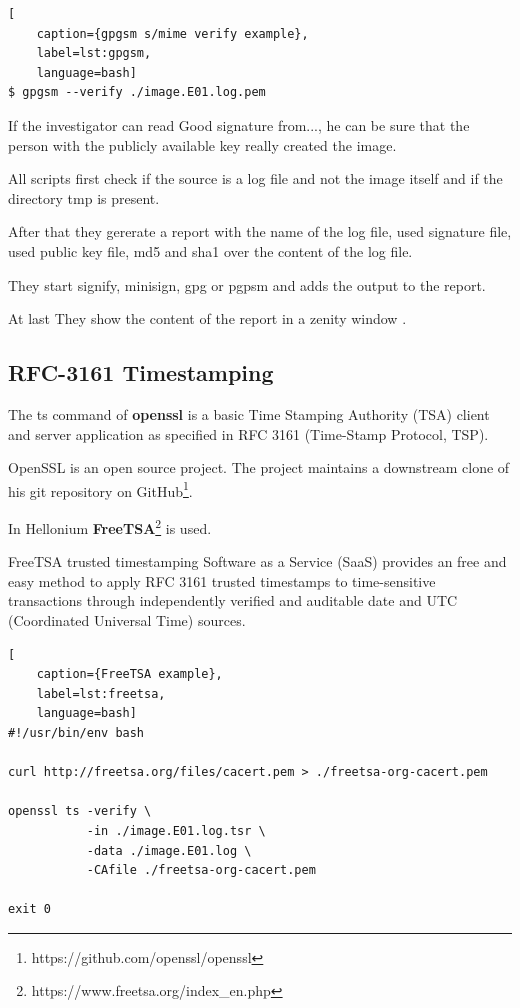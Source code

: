 \begin{lstlisting}[
    caption={gpgsm s/mime verify example},
    label=lst:gpgsm,
    language=bash]
$ gpgsm --verify ./image.E01.log.pem
\end{lstlisting}

If the investigator can read \glqq{}Good signature from...\grqq{}, he can be sure that the person with the publicly available key really created the image.

All scripts first check if the source is a log file and not the image itself and if the directory tmp is present.

After that they gererate a report with the name of the log file, used signature file, used public key file, md5 and sha1 over the content of the log file.

They start signify, minisign, gpg or pgpsm and adds the output to the report.

At last They show the content of the report in a zenity window .

\subsection{RFC-3161 Timestamping}

The ts command of \textbf{openssl} is a basic Time Stamping Authority (TSA) client and server application as specified in RFC 3161 (Time-Stamp Protocol, TSP).

OpenSSL is an open source project. The project maintains a downstream clone of his git repository on GitHub\footnote{https://github.com/openssl/openssl}.

In Hellonium \textbf{FreeTSA}\footnote{https://www.freetsa.org/index\_en.php} is used.

FreeTSA trusted timestamping Software as a Service (SaaS) provides an free and easy method to apply RFC 3161 trusted timestamps to time-sensitive transactions through independently verified and auditable date and UTC (Coordinated Universal Time) sources.

\begin{lstlisting}[
    caption={FreeTSA example},
    label=lst:freetsa,
    language=bash]
#!/usr/bin/env bash

curl http://freetsa.org/files/cacert.pem > ./freetsa-org-cacert.pem

openssl ts -verify \
           -in ./image.E01.log.tsr \
           -data ./image.E01.log \
           -CAfile ./freetsa-org-cacert.pem
  
exit 0
\end{lstlisting}

